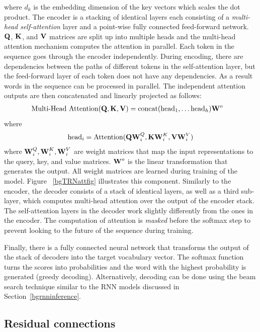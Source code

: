 \noindent where $d_k$ is the embedding dimension of the key vectors which scales the dot product. The encoder is a stacking of identical layers each consisting of a \textit{multi-head self-attention} layer and a point-wise fully connected feed-forward network.
$\bm{\mathbf{Q}}$, $\bm{\mathbf{K}}$, and $\bm{\mathbf{V}}$ matrices are split up into multiple heads and the multi-head attention mechanism computes the attention in parallel. 
Each token in the sequence goes through the encoder independently. 
During encoding, there are dependencies between the paths of different tokens in the self-attention layer, but the feed-forward layer of each token does not have any dependencies.
As a result words in the sequence can be processed in parallel. 
The independent attention outputs are then concatenated and linearly projected as follows: %
\begin{align}
\text{Multi-Head Attention} (\bm{\mathbf{Q}}, \bm{\mathbf{K}}, \bm{\mathbf{V}}) &= \operatorname*{concat} (\text{head}_1, \ldots \text{head}_h) \bm{\mathbf{W}}^o 
\end{align}
\noindent
where
\begin{align}
\text{head}_i = \operatorname*{Attention}(\bm{\mathbf{Q}}\bm{\mathbf{W}}_i^Q, \bm{\mathbf{K}}\bm{\mathbf{W}}_i^K, \bm{\mathbf{V}}\bm{\mathbf{W}}_i^V) 
\end{align}
\noindent
where $\bm{\mathbf{W}}_i^Q, \bm{\mathbf{W}}_i^K, \bm{\mathbf{W}}_i^V$ are weight matrices that map the input representations to the query, key, and value matrices. $\bm{\mathbf{W}}^o$ is the linear transformation that generates the output. 
All weight matrices are learned during training of the model.
Figure ~\ref{bgTRNattfig} illustrates this component. 
Similarly to the encoder, the decoder consists of a stack of identical layers, as well as a third sub-layer, which computes multi-head attention over the output of the encoder stack.
The self-attention layers in the decoder work slightly differently from the ones in the encoder. 
The computation of attention is \textit{masked} before the softmax step to prevent looking to the future of the sequence during training. 

Finally, there is a fully connected neural network that transforms the output of the stack of decoders into the target vocabulary vector.
The softmax function turns the scores into probabilities and the word with the highest probability is generated (greedy decoding). 
Alternatively, decoding can be done using the beam search technique similar to the RNN models discussed in Section~\ref{bgrnninference}.

\subsection{Residual connections} 

